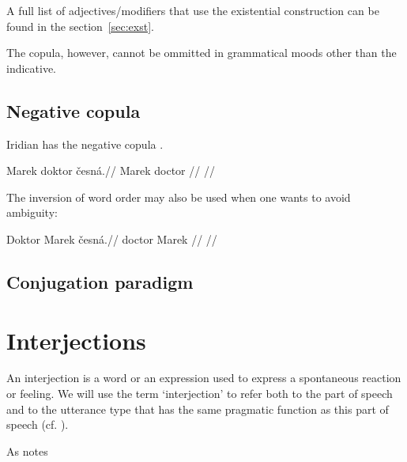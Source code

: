A full list of adjectives/modifiers that use the existential construction can be found in the section~\ref{sec:exst}.

The copula, however, cannot be ommitted in grammatical moods other than the indicative.

\subsection{Negative copula}

Iridian has the negative copula .

\pex
\begingl
\gla Marek doktor \v{c}esná.//
\glb Marek doctor //
\glft {}//
\endgl
\xe

\par The inversion of word order may also be used when one wants to avoid ambiguity:

\pex
\begingl
\gla Doktor Marek \v{c}esná.//
\glb doctor Marek //
\glft {}//
\endgl
\xe


\subsection{Conjugation paradigm}

\section{Interjections}

An interjection is a word or an expression used to express a spontaneous reaction or feeling. We will use the term `interjection' to refer both to the part of speech and to the utterance type that has the same pragmatic function as this part of speech (cf. \cite{ameka1992}).

As \textcite{jovanovic2004} notes

